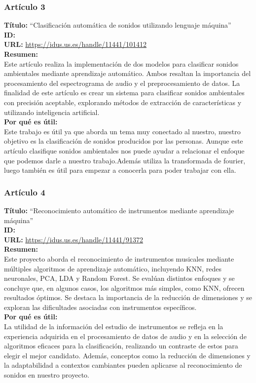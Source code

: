 \subsubsection*{Artículo 3}
\begin{flushleft}
    \textbf{Título:}
    “Clasificación automática de sonidos utilizando lenguaje máquina”
    \\
    \textbf{ID: \cite{rodriguez2020clasificacion}}
    \\
    \textbf{URL:}
    \url{https://idus.us.es/handle/11441/101412}
    \\
    \textbf{Resumen:\\}
    Este artículo realiza la implementación de dos modelos para clasificar sonidos ambientales mediante aprendizaje automático. Ambos resaltan la importancia del procesamiento del espectrograma de audio y el preprocesamiento de datos. La finalidad de este artículo es crear un sistema para clasificar sonidos ambientales con precisión aceptable, explorando métodos de extracción de características y utilizando inteligencia artificial.
    \\
    \textbf{Por qué es útil:\\}
    Este trabajo es útil ya que aborda un tema muy conectado al nuestro, nuestro objetivo es la clasificación de sonidos producidos por las personas. Aunque este artículo clasifique sonidos ambientales nos puede ayudar a relacionar el enfoque que podemos darle a nuestro trabajo.Además utiliza la transformada de fourier, luego también es útil para empezar a conocerla para poder trabajar con ella.
\end{flushleft}
\subsubsection*{Artículo 4}
\begin{flushleft}
    \textbf{Título:}
    “Reconocimiento automático de instrumentos mediante aprendizaje máquina”
    \\
    \textbf{ID: \cite{salgado2019reconocimiento}}
    \\
    \textbf{URL:}
    \url{https://idus.us.es/handle/11441/91372}
    \\
    \textbf{Resumen:\\}
    Este proyecto aborda el reconocimiento de instrumentos musicales mediante múltiples algoritmos de aprendizaje automático, incluyendo KNN, redes neuronales, PCA, LDA y Random Forest. Se evalúan distintos enfoques y se concluye que, en algunos casos, los algoritmos más simples, como KNN, ofrecen resultados óptimos. Se destaca la importancia de la reducción de dimensiones y se exploran las dificultades asociadas con instrumentos específicos.
    \\
    \textbf{Por qué es útil:\\}
    La utilidad de la información del estudio de instrumentos se refleja en la experiencia adquirida en el procesamiento de datos de audio y en la selección de algoritmos eficaces para la clasificación, realizando un contraste de estos para elegir el mejor candidato. Además, conceptos como la reducción de dimensiones y la adaptabilidad a contextos cambiantes pueden aplicarse al reconocimiento de sonidos en nuestro proyecto.
\end{flushleft}
